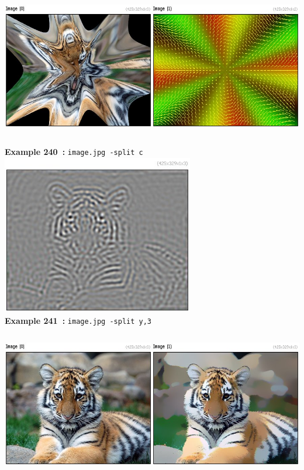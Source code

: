 \documentclass[a4paper,11pt,twoside]{book}
\begin{document}
\begin{center}\includegraphics[keepaspectratio=true,height=7cm,width=\textwidth]{img/gmic_def240.jpg}\\
{\footnotesize \textbf{Example 240~:} \texttt{image.jpg -split c}}
\\\includegraphics[keepaspectratio=true,height=7cm,width=\textwidth]{img/gmic_def241.jpg}\\
{\footnotesize \textbf{Example 241~:} \texttt{image.jpg -split y,3}}
\\\includegraphics[keepaspectratio=true,height=7cm,width=\textwidth]{img/gmic_def242.jpg}\\

\end{center}
\end{document}
